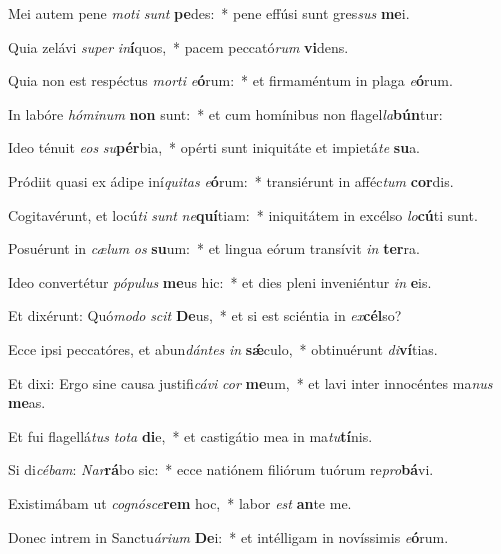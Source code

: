 \item Mei autem pene \textit{mo}\textit{ti} \textit{sunt} \textbf{pe}des:~* pene effúsi sunt gres\textit{sus} \textbf{me}i.
\item Quia zelávi \textit{su}\textit{per} \textit{in}\textbf{í}quos,~* pacem peccató\textit{rum} \textbf{vi}dens.
\item Quia non est respéctus \textit{mor}\textit{ti} \textit{e}\textbf{ó}rum:~* et firmaméntum in plaga \textit{e}\textbf{ó}rum.
\item In labóre \textit{hó}\textit{mi}\textit{num} \textbf{non} sunt:~* et cum homínibus non flagel\textit{la}\textbf{bún}tur:
\item Ideo ténuit \textit{e}\textit{os} \textit{su}\textbf{pér}bia,~* opérti sunt iniquitáte et impietá\textit{te} \textbf{su}a.
\item Pródiit quasi ex ádipe iní\textit{qui}\textit{tas} \textit{e}\textbf{ó}rum:~* transiérunt in afféc\textit{tum} \textbf{cor}dis.
\item Cogitavérunt, et locú\textit{ti} \textit{sunt} \textit{ne}\textbf{quí}tiam:~* iniquitátem in excélso \textit{lo}\textbf{cú}ti sunt.
\item Posuérunt in \textit{cæ}\textit{lum} \textit{os} \textbf{su}um:~* et lingua eórum transívit \textit{in} \textbf{ter}ra.
\item Ideo convertétur \textit{pó}\textit{pu}\textit{lus} \textbf{me}us hic:~* et dies pleni inveniéntur \textit{in} \textbf{e}is.
\item Et dixérunt: Quó\textit{mo}\textit{do} \textit{scit} \textbf{De}us,~* et si est sciéntia in \textit{ex}\textbf{cél}so?
\item Ecce ipsi peccatóres, et abun\textit{dán}\textit{tes} \textit{in} \textbf{sǽ}culo,~* obtinuérunt \textit{di}\textbf{ví}tias.
\item Et dixi: Ergo sine causa justifi\textit{cá}\textit{vi} \textit{cor} \textbf{me}um,~* et lavi inter innocéntes ma\textit{nus} \textbf{me}as.
\item Et fui flagellá\textit{tus} \textit{to}\textit{ta} \textbf{di}e,~* et castigátio mea in ma\textit{tu}\textbf{tí}nis.
\item Si di\textit{cé}\textit{bam}: \textit{Nar}\textbf{rá}bo sic:~* ecce natiónem filiórum tuórum re\textit{pro}\textbf{bá}vi.
\item Existimábam ut \textit{co}\textit{gnó}\textit{sce}\textbf{rem} hoc,~* labor \textit{est} \textbf{an}te me.
\item Donec intrem in Sanctu\textit{á}\textit{ri}\textit{um} \textbf{De}i:~* et intélligam in novíssimis \textit{e}\textbf{ó}rum.
